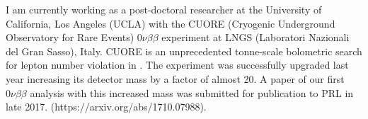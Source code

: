\documentclass[12pt,letterpaper,sans]{moderncv}        %
\begin{document}
I am currently working as a post-doctoral researcher at the University of
California, Los Angeles (UCLA) with the CUORE (Cryogenic Underground
Observatory for Rare Events) $0\nu\beta\beta$ experiment at LNGS (Laboratori
Nazionali del Gran Sasso), Italy. CUORE is an unprecedented tonne-scale
bolometric search for lepton number violation in . The experiment
was successfully upgraded last year increasing its detector mass by a factor of
almost 20. A paper of our first $0\nu\beta\beta$ analysis with this increased
mass was submitted for publication to PRL in late 2017.
(https://arxiv.org/abs/1710.07988).



\end{document}
